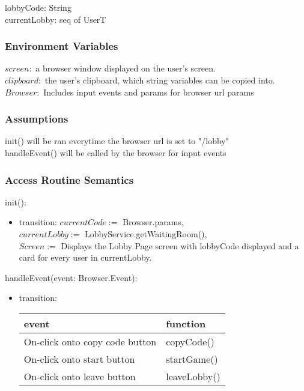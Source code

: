 \documentclass[12pt, titlepage]{article}
\begin{document}
lobbyCode: String\\
currentLobby: seq of UserT

\subsubsection{Environment Variables}

$screen: $ a browser window displayed on the user's screen. \\
$clipboard: $ the user's clipboard, which string variables can be copied into.\\
$Browser: $ Includes input events and params for browser url params

\subsubsection{Assumptions}

init() will be ran everytime the browser url is set to "/lobby"\\
handleEvent() will be called by the browser for input events

\subsubsection{Access Routine Semantics}

\noindent init():
\begin{itemize}
\item transition: $currentCode := $ Browser.params,\\
$currentLobby :=$ LobbyService.getWaitingRoom(),\\
$Screen := $ Displays the Lobby Page screen with lobbyCode displayed and a card for every user in currentLobby.
\end{itemize}



\noindent handleEvent(event: Browser.Event):
\begin{itemize}
\item transition: \begin{tabular}{p{5cm} p{4cm}}
\hline
\textbf{event} & \textbf{function} \\
\hline
On-click onto copy code button & copyCode() \\
On-click onto start button & startGame() \\
On-click onto leave button & leaveLobby() \\
\hline
\end{tabular}
    
\end{itemize}
\end{document}
